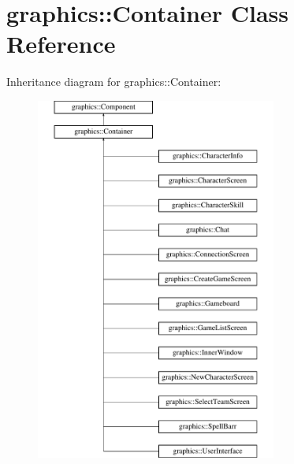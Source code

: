 \hypertarget{classgraphics_1_1_container}{\section{graphics\-:\-:Container Class Reference}
\label{classgraphics_1_1_container}
}
Inheritance diagram for graphics\-:\-:Container\-:\begin{figure}[H]
\begin{center}
\leavevmode
\includegraphics[height=12.000000cm]{classgraphics_1_1_container}
\end{center}
\end{figure}
